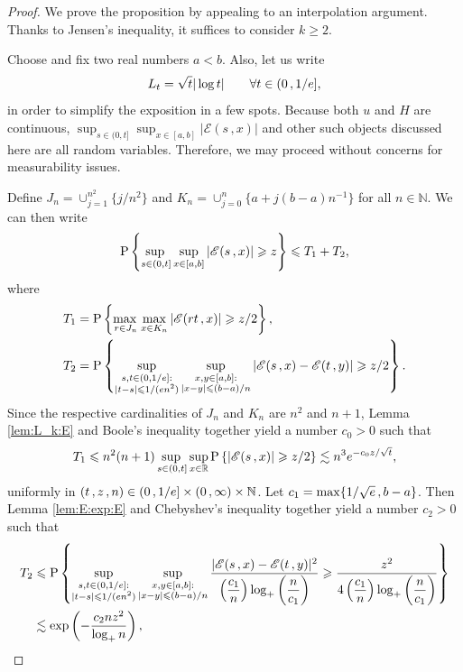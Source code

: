 \documentclass[10pt,a4paper]{amsart}
\newcommand{\N}{\mathbb{N}}
\newcommand{\R}{\mathbb{R}}
\newcommand{\e}{{\rm e}}
\renewcommand{\P}{\mathrm{P}}
\renewcommand{\ge}{\geqslant}
\renewcommand{\le}{\leqslant}
\begin{document}
\begin{proof}
	We prove the proposition by appealing to an
	interpolation argument. Thanks to Jensen's inequality,
	it suffices to consider $k\ge 2$.
	
	Choose and fix two real numbers
	$a<b$. Also, let us write
	\[
		L_t = \sqrt{t}|\log t|\qquad\forall t\in(0\,,1/\e],
	\]
	in order to simplify the exposition in a few spots.
	Because both $u$ and $H$ are continuous, 
	$\sup_{s\in(0,t]}\sup_{x\in[a,b]}|\mathscr{E}(s\,,x)|$
	and other such objects discussed here are all random variables. Therefore,
	we may proceed without concerns for measurability issues.
	
	Define $J_n = \cup_{j=1}^{n^2}\{ j/n^2\}$ and
	$K_n = \cup_{j=0}^n \{ a + j(b-a)n^{-1}\}$ for all $n\in\N$.
	We can then write
	\[
		\P\left\{ \adjustlimits\sup_{s\in(0,t]}
		\sup_{x\in[a,b]} |\mathscr{E}(s\,,x)| \ge z\right\} 
		\le T_1 + T_2,
	\]
	where
	\begin{align*}
		T_1 &= \P\left\{ \adjustlimits\max_{r\in J_n}
			\max_{x\in K_n} |\mathscr{E}(r t \,,x)| \ge
			z/2\right\},\\
		T_2 &= \P\left\{\sup_{\substack{s,t\in (0,1/\e]:\\
			|t-s|\le 1/(\e n^2)}}
			\sup_{\substack{x,y\in [a,b]:\\
			|x-y|\le (b-a)/n}} |\mathscr{E}(s\,,x)-\mathscr{E}(t\,,y)| \ge
			z/2 \right\}.
	\end{align*}
	Since the respective cardinalities of $J_n$ and $K_n$ are $n^2$ and $n+1$, 
	Lemma \ref{lem:L_k:E} and Boole's inequality together yield
	a number $c_0>0$ such that
	\[
		T_1 \le n^2(n+1)\adjustlimits\sup_{s\in(0,t]}\sup_{x\in\R}
		\P\left\{ |\mathscr{E}(s\,,x)| 
		\ge z/2\right\} \lesssim n^3 \e^{-c_0z/\sqrt{t}},
	\]
	uniformly in $(t\,,z\,,n)\in(0\,,1/\e]\times(0\,,\infty)\times\N$. 
	Let $c_1 = \max\{ 1/\sqrt{\e}\,,b-a \}$.
	Then Lemma \ref{lem:E:exp:E} and Chebyshev's inequality together yield
	a number $c_2>0$ such that
	\begin{align*}
		T_2 &\le
			\P\left\{\sup_{\substack{s,t\in (0,1/\e]:\\|t-s|\le1/(\e n^2)}}
			\sup_{\substack{x,y\in [a,b]:\\
			|x-y|\le (b-a)/n}} \frac{|\mathscr{E}(s\,,x)-\mathscr{E}(t\,,y)|^2}{
			\left(\dfrac{c_1}{n}\right)\log_+\left(\dfrac{n}{c_1}\right)} \ge
			\frac{z^2}{4\left(\dfrac{c_1}{n}\right)
			\log_+\left(\dfrac{n}{c_1}\right)} \right\}\\
		&\lesssim\exp\left( - \frac{c_2nz^2}{\log_+ n}\right),
	\end{align*}

\end{proof}
\end{document}
